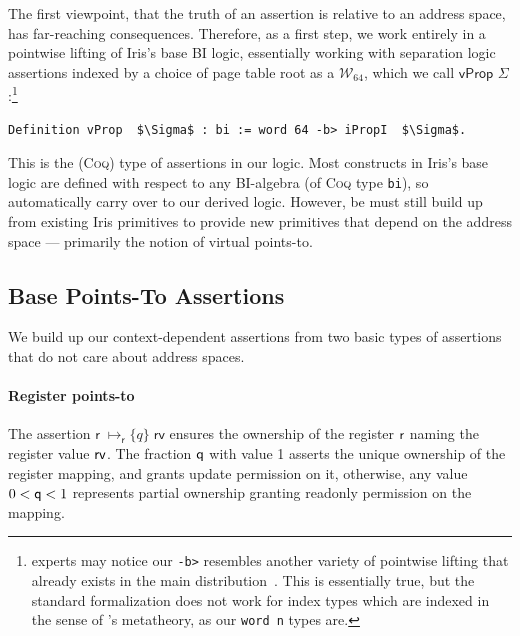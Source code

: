 The first viewpoint, that the truth of an assertion is relative to an address space, has far-reaching consequences.
Therefore, as a first step, we work entirely in a pointwise lifting of Iris's base BI logic,
essentially working with separation logic assertions indexed by a choice of page table root as a $\mathcal{W}_{64}$, which we call $\textsf{vProp }\Sigma$:\footnote{
  \iris experts may notice our \lstinline|-b>| resembles another variety of pointwise lifting that already exists in the main \iris
  distribution~\cite{dang2019rustbelt,dang2022compass}. This is essentially true, but the standard formalization does not work for index types which
  are indexed in the sense of \coq's metatheory, as our \lstinline|word n| types are.
}
\begin{lstlisting}[language=Coq]
  Definition vProp  $\Sigma$ : bi := word 64 -b> iPropI  $\Sigma$.
\end{lstlisting}
This is the (\textsc{Coq}) type of assertions in our logic.
Most constructs in Iris's base logic are defined with respect to any BI-algebra (of \textsc{Coq} type \lstinline|bi|), so automatically
carry over to our derived logic.
However, be must still build up from existing Iris primitives to provide new primitives that depend on the address space --- primarily the notion
of virtual points-to.


\subsection{Base Points-To Assertions}
\label{sec:pointsto}
We build up our context-dependent assertions from two basic types of assertions that do not care about address spaces.

\paragraph{Register points-to} 
The assertion $\textsf{r}\;\mapsto_{\textsf{r}}\{q\}\;\textsf{rv}$ ensures the ownership of the register $\mathsf{r}$ naming the register value $\mathsf{rv}$. 
The fraction $\mathsf{q}$ with value 1 asserts the unique ownership of the register mapping, and grants update permission on it, 
otherwise, any value $0 < \mathsf{q} <1$ represents partial ownership granting readonly permission on the mapping.


